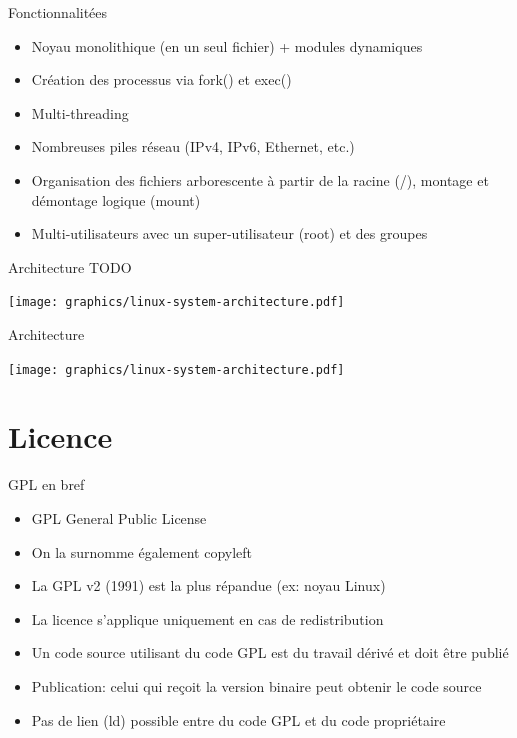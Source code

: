 \begin{frame}{Fonctionnalitées}{}
  \begin{itemize}
  \item Noyau monolithique (en un seul fichier) + modules dynamiques
  \item Création des processus via fork() et exec()
  \item Multi-threading
  \item Nombreuses piles réseau (IPv4, IPv6, Ethernet, etc.)
  \item Organisation des fichiers arborescente à partir de la racine (/), montage et démontage logique (mount)
  \item Multi-utilisateurs avec un super-utilisateur (root) et des groupes
  \end{itemize}
\end{frame}

\begin{frame}{Architecture TODO}{}
  \begin{center}
    \texttt{[image: graphics/linux-system-architecture.pdf]}
  \end{center}
\end{frame}

\begin{frame}{Architecture}{}
  \begin{center}
    \texttt{[image: graphics/linux-system-architecture.pdf]}
  \end{center}
\end{frame}

\section{Licence}

\begin{frame}{GPL en bref}{}
  \begin{itemize}
  \item GPL General Public License
  \item On la surnomme également copyleft
  \item La GPL v2 (1991) est la plus répandue (ex: noyau Linux)
  \item La licence s'applique uniquement en cas de redistribution
  \item Un code source utilisant du code GPL est du travail dérivé et doit être publié
  \item Publication: celui qui reçoit la version binaire peut obtenir le code source
  \item Pas de lien (ld) possible entre du code GPL et du code propriétaire
  \end{itemize}
\end{frame}

